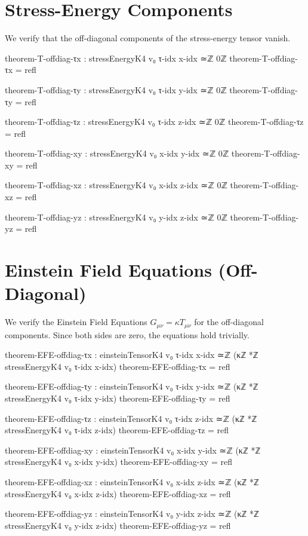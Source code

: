 \documentclass[11pt,a4paper]{book}
\begin{document}
\section{Stress-Energy Components}

We verify that the off-diagonal components of the stress-energy tensor vanish.

\begin{code}
theorem-T-offdiag-τx : stressEnergyK4 v₀ τ-idx x-idx ≃ℤ 0ℤ
theorem-T-offdiag-τx = refl

theorem-T-offdiag-τy : stressEnergyK4 v₀ τ-idx y-idx ≃ℤ 0ℤ
theorem-T-offdiag-τy = refl

theorem-T-offdiag-τz : stressEnergyK4 v₀ τ-idx z-idx ≃ℤ 0ℤ
theorem-T-offdiag-τz = refl

theorem-T-offdiag-xy : stressEnergyK4 v₀ x-idx y-idx ≃ℤ 0ℤ
theorem-T-offdiag-xy = refl

theorem-T-offdiag-xz : stressEnergyK4 v₀ x-idx z-idx ≃ℤ 0ℤ
theorem-T-offdiag-xz = refl

theorem-T-offdiag-yz : stressEnergyK4 v₀ y-idx z-idx ≃ℤ 0ℤ
theorem-T-offdiag-yz = refl
\end{code}

\section{Einstein Field Equations (Off-Diagonal)}

We verify the Einstein Field Equations $G_{\mu\nu} = \kappa T_{\mu\nu}$ for the off-diagonal components. Since both sides are zero, the equations hold trivially.

\begin{code}
theorem-EFE-offdiag-τx : einsteinTensorK4 v₀ τ-idx x-idx ≃ℤ (κℤ *ℤ stressEnergyK4 v₀ τ-idx x-idx)
theorem-EFE-offdiag-τx = refl

theorem-EFE-offdiag-τy : einsteinTensorK4 v₀ τ-idx y-idx ≃ℤ (κℤ *ℤ stressEnergyK4 v₀ τ-idx y-idx)
theorem-EFE-offdiag-τy = refl

theorem-EFE-offdiag-τz : einsteinTensorK4 v₀ τ-idx z-idx ≃ℤ (κℤ *ℤ stressEnergyK4 v₀ τ-idx z-idx)
theorem-EFE-offdiag-τz = refl

theorem-EFE-offdiag-xy : einsteinTensorK4 v₀ x-idx y-idx ≃ℤ (κℤ *ℤ stressEnergyK4 v₀ x-idx y-idx)
theorem-EFE-offdiag-xy = refl

theorem-EFE-offdiag-xz : einsteinTensorK4 v₀ x-idx z-idx ≃ℤ (κℤ *ℤ stressEnergyK4 v₀ x-idx z-idx)
theorem-EFE-offdiag-xz = refl

theorem-EFE-offdiag-yz : einsteinTensorK4 v₀ y-idx z-idx ≃ℤ (κℤ *ℤ stressEnergyK4 v₀ y-idx z-idx)
theorem-EFE-offdiag-yz = refl
\end{code}
\end{document}
